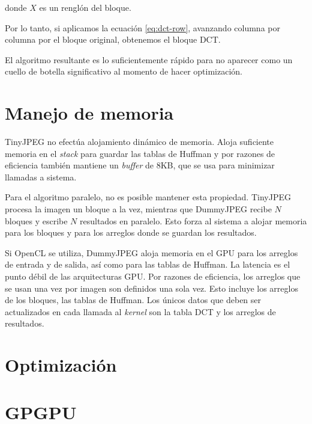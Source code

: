 donde $X$ es un renglón del bloque.

Por lo tanto, si aplicamos la ecuación \ref{eq:dct-row}, avanzando columna por columna por el bloque original, obtenemos el bloque DCT.

El algoritmo resultante es lo suficientemente rápido para no aparecer como un cuello de botella significativo al momento de hacer optimización.

\section{Manejo de memoria}

TinyJPEG no efectúa alojamiento dinámico de memoria. Aloja suficiente memoria en el \emph{stack} para guardar las tablas de Huffman y por razones de eficiencia también mantiene un \emph{buffer} de 8KB, que se usa para minimizar llamadas a sistema.

Para el algoritmo paralelo, no es posible mantener esta propiedad. TinyJPEG procesa la imagen un bloque a la vez, mientras que DummyJPEG recibe $N$ bloques y escribe $N$ resultados en paralelo. Esto forza al sistema a alojar memoria para los bloques y para los arreglos donde se guardan los resultados.

Si OpenCL se utiliza, DummyJPEG aloja memoria en el GPU para los arreglos de entrada y de salida, así como para las tablas de Huffman. La latencia es el punto débil de las arquitecturas GPU. Por razones de eficiencia, los arreglos que se usan una vez por imagen son definidos una sola vez. Esto incluye los arreglos de los bloques, las tablas de Huffman. Los únicos datos que deben ser actualizados en cada llamada al \emph{kernel} son la tabla DCT y los arreglos de resultados.


\section{Optimización}

\section{GPGPU} \label{sec:GPGPU}
